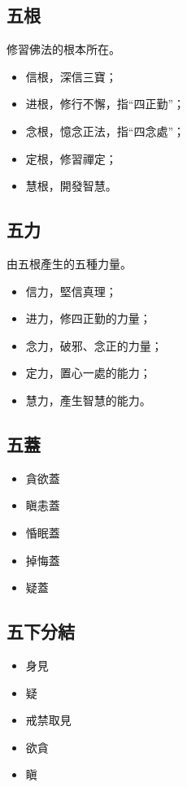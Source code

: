 \subsection{五根}
修習佛法的根本所在。
\begin{itemize}
  \item 信根，深信三寶；
  \item 进根，修行不懈，指“四正勤”；
  \item 念根，憶念正法，指“四念處”；
  \item 定根，修習禪定；
  \item 慧根，開發智慧。
\end{itemize}

\subsection{五力}
由五根產生的五種力量。
\begin{itemize}
  \item 信力，堅信真理；
  \item 进力，修四正勤的力量；
  \item 念力，破邪、念正的力量；
  \item 定力，置心一處的能力；
  \item 慧力，產生智慧的能力。
\end{itemize}

\subsection{五蓋}
\begin{itemize}
  \item 貪欲蓋
  \item 瞋恚蓋
  \item 惛眠蓋
  \item 掉悔蓋
  \item 疑蓋
\end{itemize}

\subsection{五下分結}
\begin{itemize}
  \item 身見
  \item 疑
  \item 戒禁取見
  \item 欲貪
  \item 瞋
\end{itemize}

